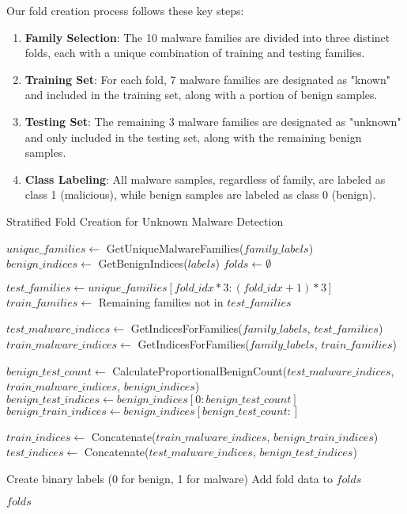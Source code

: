 Our fold creation process follows these key steps:

\begin{enumerate}
    \item \textbf{Family Selection}: The 10 malware families are divided into three distinct folds, each with a unique combination of training and testing families.
    
    \item \textbf{Training Set}: For each fold, 7 malware families are designated as "known" and included in the training set, along with a portion of benign samples.
    
    \item \textbf{Testing Set}: The remaining 3 malware families are designated as "unknown" and only included in the testing set, along with the remaining benign samples.
    
    \item \textbf{Class Labeling}: All malware samples, regardless of family, are labeled as class 1 (malicious), while benign samples are labeled as class 0 (benign).
\end{enumerate}

\begin{algorithm}[!htbp]
\caption{Stratified Fold Creation for Unknown Malware Detection}
\label{alg:fold-creation}
\begin{algorithmic}[1]
    \State $unique\_families \leftarrow$ GetUniqueMalwareFamilies($family\_labels$)
    \State $benign\_indices \leftarrow$ GetBenignIndices($labels$)
    \State $folds \leftarrow \emptyset$
    
        \State $test\_families \leftarrow unique\_families[fold\_idx*3:(fold\_idx+1)*3]$
        \State $train\_families \leftarrow$ Remaining families not in $test\_families$
        
        \State $test\_malware\_indices \leftarrow$ GetIndicesForFamilies($family\_labels$, $test\_families$)
        \State $train\_malware\_indices \leftarrow$ GetIndicesForFamilies($family\_labels$, $train\_families$)
        
        \State $benign\_test\_count \leftarrow$ CalculateProportionalBenignCount($test\_malware\_indices$, $train\_malware\_indices$, $benign\_indices$)
        \State $benign\_test\_indices \leftarrow benign\_indices[0:benign\_test\_count]$
        \State $benign\_train\_indices \leftarrow benign\_indices[benign\_test\_count:]$
        
        \State $train\_indices \leftarrow$ Concatenate($train\_malware\_indices$, $benign\_train\_indices$)
        \State $test\_indices \leftarrow$ Concatenate($test\_malware\_indices$, $benign\_test\_indices$)
        
        \State Create binary labels (0 for benign, 1 for malware)
        \State Add fold data to $folds$
    \EndFor
    
    \Return $folds$
\EndProcedure
\end{algorithmic}
\end{algorithm}

